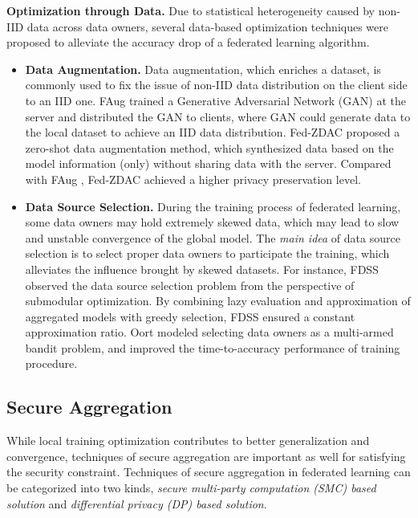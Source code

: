 \documentclass[11pt]{article}
\newcommand{\fakeparagraph}[1]{\vspace{1mm}\noindent\textbf{#1.}}
\begin{document}
\fakeparagraph{Optimization through Data}
Due to statistical heterogeneity caused by non-IID data across data owners, several data-based optimization techniques were proposed to alleviate the accuracy drop of a federated learning algorithm.
\begin{itemize}
    \item \textbf{Data Augmentation.}
    Data augmentation, which enriches a dataset, is commonly used to fix the issue of non-IID data distribution on the client side to an IID one.
    \textsf{FAug} \cite{Yongxin-DBLP:journals/corr/abs-1811-11479} trained a Generative Adversarial Network (GAN) at the server and distributed the GAN to clients, where GAN could generate data to the local dataset to achieve an IID data distribution.
    \textsf{Fed-ZDAC} \cite{Yongxin-DBLP:conf/cvpr/HaoELZLCC21} proposed a zero-shot data augmentation method, which synthesized data based on the model information (only) without sharing data with the server.
	Compared with \textsf{FAug} \cite{Yongxin-DBLP:journals/corr/abs-1811-11479}, \textsf{Fed-ZDAC} \cite{Yongxin-DBLP:conf/cvpr/HaoELZLCC21} achieved a higher privacy preservation level.
	
    \item \textbf{Data Source Selection.}
    During the training process of federated learning, some data owners may hold extremely skewed data, which may lead to slow and unstable convergence of the global model.
    The \textit{main idea} of data source selection is to select proper data owners to participate the training, which alleviates the influence brought by skewed datasets.
    For instance, \textsf{FDSS} \cite{Yongxin-DBLP:conf/dasfaa/ZhangWZRTX22} observed the data source selection problem from the perspective of submodular optimization. By combining lazy evaluation and approximation of aggregated models with greedy selection, \textsf{FDSS} ensured a constant approximation ratio.
    \textsf{Oort} \cite{Yongxin-DBLP:conf/osdi/LaiZMC21} modeled selecting data owners as a multi-armed bandit problem, and improved the time-to-accuracy performance of training procedure.
\end{itemize}

\subsection{Secure Aggregation}\label{sec:learning-secure}
While local training optimization contributes to better generalization and convergence, techniques of secure aggregation are important as well for satisfying the security constraint.
Techniques of secure aggregation in federated learning can be categorized into two kinds, \textit{secure multi-party computation (SMC) based solution} and \textit{differential privacy (DP) based solution}.
\end{document}
